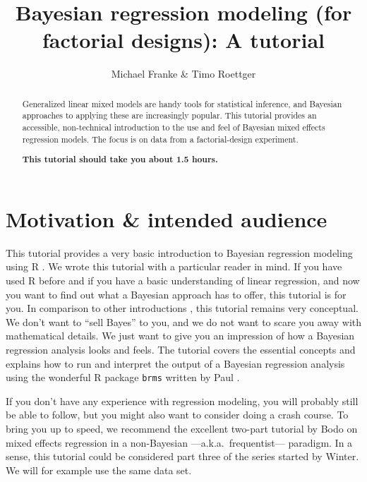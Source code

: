 \documentclass[nobib]{tufte-handout}
\title{Bayesian regression modeling (for factorial designs): A tutorial}
\author{Michael Franke \& Timo Roettger}
\date{}
\begin{document}
\maketitle

\begin{abstract}
  \noindent Generalized linear mixed models are handy tools for statistical inference, and Bayesian approaches to applying these are increasingly popular. This tutorial provides an accessible, non-technical introduction to the use and feel of Bayesian mixed effects regression models. The focus is on data from a factorial-design experiment. \\
  
  \medskip
  
  \noindent \textbf{This tutorial should take you about 1.5 hours.}
\end{abstract}

\section{Motivation \& intended audience}

This tutorial provides a very basic introduction to Bayesian regression modeling using R \citep{Manual}. We wrote this tutorial with a particular reader in mind. If you have used R before and if you have a basic understanding of linear regression, and now you want to find out what a Bayesian approach has to offer, this tutorial is for you. In comparison to other introductions \citep[e.g.][]{SorensenHohensteinb2016:Bayesian-linear}, this tutorial remains very conceptual. We don’t want to ``sell Bayes'' to you, and we do not want to scare you away with mathematical details. We just want to give you an impression of how a Bayesian regression analysis looks and feels. The tutorial covers the essential concepts and explains how to run and interpret the output of a Bayesian regression analysis using the wonderful R package \texttt{brms} written by Paul \citet{buerkner2016brms}.



If you don’t have any experience with regression modeling, you will probably still be able to follow, but you might also want to consider doing a crash course. To bring you up to speed, we recommend the excellent two-part tutorial by Bodo \citet{Winter2013:Linear-models-a} on mixed effects regression in a non-Bayesian ---a.k.a.~frequentist--- paradigm. In a sense, this tutorial could be considered part three of the series started by Winter. We will for example use the same data set.
\end{document}
